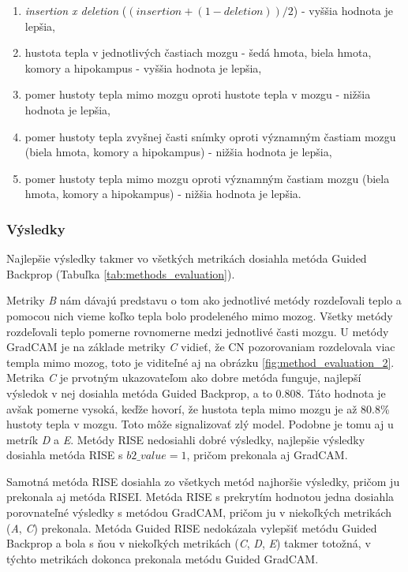 \begin{enumerate}[label=\Alph*]
    \item \textit{insertion x deletion} ($(insertion + (1 - deletion)) / 2$) - vyššia hodnota je lepšia,
    \item hustota tepla v jednotlivých častiach mozgu - šedá hmota, biela hmota, komory a hipokampus - vyššia hodnota je lepšia,
    \item pomer hustoty tepla mimo mozgu oproti hustote tepla v mozgu - nižšia hodnota je lepšia,
    \item pomer hustoty tepla zvyšnej časti snímky oproti významným častiam mozgu (biela hmota, komory a hipokampus) - nižšia hodnota je lepšia,
    \item pomer hustoty tepla mimo mozgu oproti významným častiam mozgu (biela hmota, komory a hipokampus) - nižšia hodnota je lepšia.
\end{enumerate}

\subsubsection{Výsledky}

Najlepšie výsledky takmer vo všetkých metrikách dosiahla metóda Guided Backprop (Tabuľka \ref{tab:methods_evaluation}). 

Metriky \textit{B} nám dávajú predstavu o tom ako jednotlivé metódy rozdeľovali teplo a pomocou nich vieme koľko tepla bolo prodeleného mimo mozog. Všetky metódy rozdeľovali teplo pomerne rovnomerne medzi jednotlivé časti mozgu. U metódy GradCAM je na základe metriky \textit{C} vidieť, že CN pozorovaniam rozdelovala viac templa mimo mozog, toto je viditeľné aj na obrázku \ref{fig:method_evaluation_2}. Metrika \textit{C} je prvotným ukazovateľom ako dobre metóda funguje, najlepší výsledok v nej dosiahla metóda Guided Backprop, a to $0.808$. Táto hodnota je avšak pomerne vysoká, keďže hovorí, že hustota tepla mimo mozgu je až 80.8\% hustoty tepla v mozgu. Toto môže signalizovať zlý model. Podobne je tomu aj u metrík \textit{D} a \textit{E}. Metódy RISE nedosiahli dobré výsledky, najlepšie výsledky dosiahla metóda RISE s $b2\_value = 1$, pričom prekonala aj GradCAM.

Samotná metóda RISE dosiahla zo všetkych metód najhoršie výsledky, pričom ju prekonala aj metóda RISEI. Metóda RISE s prekrytím hodnotou jedna dosiahla porovnateľné výsledky s metódou GradCAM, pričom ju v niekoľkých metrikách (\textit{A}, \textit{C}) prekonala. Metóda Guided RISE nedokázala vylepšiť metódu Guided Backprop a bola s ňou v niekoľkých metrikách (\textit{C}, \textit{D}, \textit{E}) takmer totožná, v týchto metrikách dokonca prekonala metódu Guided GradCAM.

